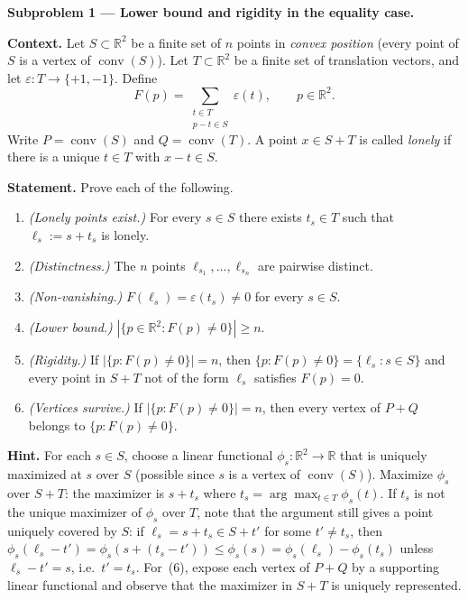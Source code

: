 \documentclass{article}
\begin{document}
\textbf{Subproblem 1 --- Lower bound and rigidity in the equality case.}

\medskip
\textbf{Context.}
Let $S\subset\mathbb{R}^2$ be a finite set of $n$ points in \emph{convex position} (every
point of $S$ is a vertex of $\operatorname{conv}(S)$).
Let $T\subset\mathbb{R}^2$ be a finite set of translation vectors, and let
$\varepsilon:T\to\{+1,-1\}$.
Define
\[
  F(p) = \sum_{\substack{t\in T\\ p-t\in S}} \varepsilon(t), \qquad p\in\mathbb{R}^2.
\]
Write $P=\operatorname{conv}(S)$ and $Q=\operatorname{conv}(T)$.
A point $x\in S+T$ is called \emph{lonely} if there is a unique $t\in T$ with
$x-t\in S$.

\medskip
\textbf{Statement.}  Prove each of the following.
\begin{enumerate}
  \item \emph{(Lonely points exist.)} For every $s\in S$ there exists $t_s\in T$ such
        that $\ell_s := s + t_s$ is lonely.
  \item \emph{(Distinctness.)} The $n$ points $\ell_{s_1},\ldots,\ell_{s_n}$ are
        pairwise distinct.
  \item \emph{(Non-vanishing.)} $F(\ell_s)=\varepsilon(t_s)\neq 0$ for every $s\in S$.
  \item \emph{(Lower bound.)} $|\{p\in\mathbb{R}^2:F(p)\neq 0\}|\ge n$.
  \item \emph{(Rigidity.)} If $|\{p:F(p)\neq 0\}|=n$, then
        $\{p:F(p)\neq 0\}=\{\ell_s:s\in S\}$ and every point in $S+T$
        not of the form $\ell_s$ satisfies $F(p)=0$.
  \item \emph{(Vertices survive.)} If $|\{p:F(p)\neq 0\}|=n$, then every vertex of
        $P+Q$ belongs to $\{p:F(p)\neq 0\}$.
\end{enumerate}

\medskip
\textbf{Hint.}
For each $s\in S$, choose a linear functional $\phi_s:\mathbb{R}^2\to\mathbb{R}$
that is uniquely maximized at $s$ over $S$ (possible since $s$ is a vertex of
$\operatorname{conv}(S)$).  Maximize $\phi_s$ over $S+T$: the maximizer is
$s+t_s$ where $t_s=\arg\max_{t\in T}\phi_s(t)$.  If $t_s$ is not the unique
maximizer of $\phi_s$ over $T$, note that the argument still gives a point
uniquely covered by $S$: if $\ell_s = s+t_s \in S+t'$ for some $t'\neq t_s$,
then $\phi_s(\ell_s-t')=\phi_s(s+(t_s-t'))\le \phi_s(s)=\phi_s(\ell_s)-\phi_s(t_s)$
unless $\ell_s-t'=s$, i.e.\ $t'=t_s$.  For~(6), expose each vertex of $P+Q$
by a supporting linear functional and observe that the maximizer in $S+T$
is uniquely represented.
\end{document}
